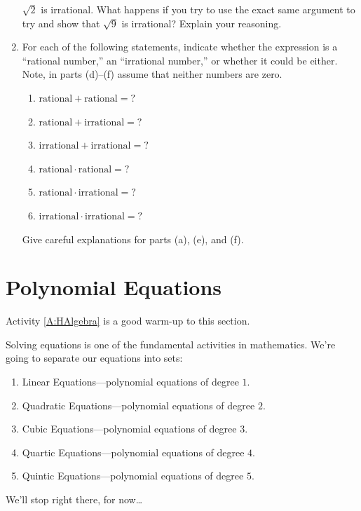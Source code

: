 \begin{problems}
\begin{enumerate}
  $\sqrt{2}$ is irrational. What happens if you try to use the exact
  same argument to try and show that $\sqrt{9}$ is irrational? Explain
  your reasoning.
\item For each of the following statements, indicate whether the expression
is a ``rational number,'' an ``irrational number,'' or whether it could be
either. Note, in parts (d)--(f) assume that neither numbers are zero.
\begin{enumerate}
\item $\text{rational}+ \text{rational} = ?$
\item $\text{rational}+ \text{irrational} = ?$
\item $\text{irrational}+ \text{irrational} = ?$

\item $\text{rational}\cdot \text{rational} = ?$
\item $\text{rational}\cdot \text{irrational} = ?$
\item $\text{irrational}\cdot \text{irrational} = ?$
\end{enumerate}
Give careful explanations for parts (a), (e), and (f).
\end{enumerate}
\end{problems}
\newpage




\section{Polynomial Equations}


\begin{activitynote}
Activity \ref{A:HAlgebra} is a good warm-up to this section.  %
\end{activitynote}

Solving equations is one of the fundamental activities in mathematics.
We're going to separate our equations into sets:
\begin{enumerate}
\item Linear Equations---polynomial equations of degree $1$.
\item Quadratic Equations---polynomial equations of degree $2$.
\item Cubic  Equations---polynomial equations of degree $3$.
\item Quartic Equations---polynomial equations of degree $4$.
\item Quintic Equations---polynomial equations of degree $5$.
\end{enumerate}
We'll stop right there, for now\dots


